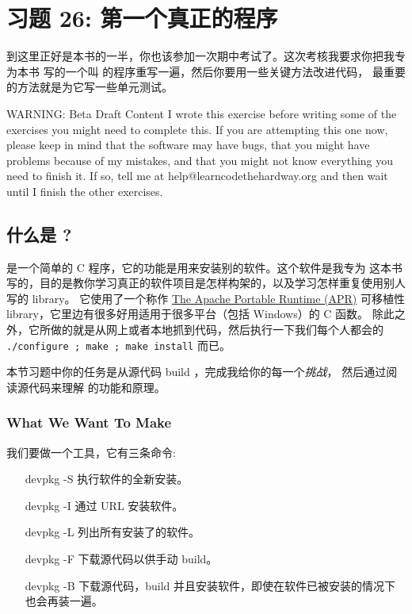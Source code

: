 \chapter{习题 26: 第一个真正的程序}

到这里正好是本书的一半，你也该参加一次期中考试了。这次考核我要求你把我专为本书
写的一个叫  的程序重写一遍，然后你要用一些关键方法改进代码，
最重要的方法就是为它写一些单元测试。

\begin{aside}{WARNING: Beta Draft Content}
I wrote this exercise before writing some of the exercises you might
need to complete this.  If you are attempting this one now, please
keep in mind that the software may have bugs, that you might have
problems because of my mistakes, and that you might not know everything
you need to finish it.  If so, tell me at help@learncodethehardway.org
and then wait until I finish the other exercises.
\end{aside}

\section{什么是 ?}

 是一个简单的 C 程序，它的功能是用来安装别的软件。这个软件是我专为
这本书写的，目的是教你学习真正的软件项目是怎样构架的，以及学习怎样重复使用别人写的 library。
它使用了一个称作 \href{http://apr.apache.org/}{The Apache Portable
Runtime (APR)} 可移植性 library，它里边有很多好用适用于很多平台（包括 Windows）的 C 函数。
除此之外，它所做的就是从网上或者本地抓到代码，然后执行一下我们每个人都会的 
\verb|./configure ; make ; make install| 而已。

本节习题中你的任务是从源代码 build ，完成我给你的每一个\emph{挑战}，
然后通过阅读源代码来理解  的功能和原理。

\subsection{What We Want To Make}

我们要做一个工具，它有三条命令:

\begin{enumerate}
\item[devpkg -S] 执行软件的全新安装。
\item[devpkg -I] 通过 URL 安装软件。
\item[devpkg -L] 列出所有安装了的软件。
\item[devpkg -F] 下载源代码以供手动 build。
\item[devpkg -B] 下载源代码，build 并且安装软件，即使在软件已被安装的情况下也会再装一遍。
\end{enumerate}

